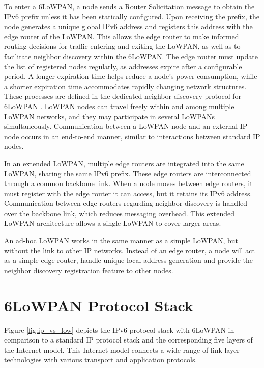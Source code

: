   To enter a 6LoWPAN, a node sends a Router Solicitation message to obtain the IPv6 prefix unless it
  has been statically configured. Upon receiving the prefix, the node generates a unique global IPv6 
  address and registers this address with the edge router of the LoWPAN. This allows the edge router 
  to make informed routing decisions for traffic entering and exiting the LoWPAN, as well as to 
  facilitate neighbor discovery within the 6LoWPAN. The edge router must update the list of registered 
  nodes regularly, as addresses expire after a configurable period.  A longer expiration time 
  helps reduce a node's power consumption, while a shorter expiration time accommodates rapidly 
  changing network structures. These processes are defined in the dedicated neighbor discovery
  protocol for 6LoWPAN \cite{rfc6775}. LoWPAN nodes can travel freely within and among multiple 
  LoWPAN networks, and they may participate in several LoWPANs simultaneously. Communication 
  between a LoWPAN node and an external IP node occurs in an end-to-end manner, similar to 
  interactions between standard IP nodes.

  In an extended LoWPAN, multiple edge routers are integrated into the same LoWPAN, 
  sharing the same IPv6 prefix. These edge routers are interconnected through a common backbone link. 
  When a node moves between edge routers, it must register with the edge router it can access, 
  but it retains its IPv6 address. Communication between edge routers regarding neighbor 
  discovery is handled over the backbone link, which reduces messaging overhead. 
  This extended LoWPAN architecture allows a single LoWPAN to cover larger areas.

  An ad-hoc LoWPAN works in the same manner as a simple LoWPAN, but without the link to other
  IP networks. Instead of an edge router, a node will act as a simple edge router, handle unique 
  local address generation \cite{rfc4193} and provide the neighbor discovery registration feature 
  to other nodes.

\section{6LoWPAN Protocol Stack}
  Figure \ref{fig:ip_vs_low} depicts the IPv6 protocol stack with 6LoWPAN in comparison to a standard IP protocol 
  stack and the corresponding five layers of the Internet model. This Internet model 
  connects a wide range of link-layer technologies with various transport and application protocols.

